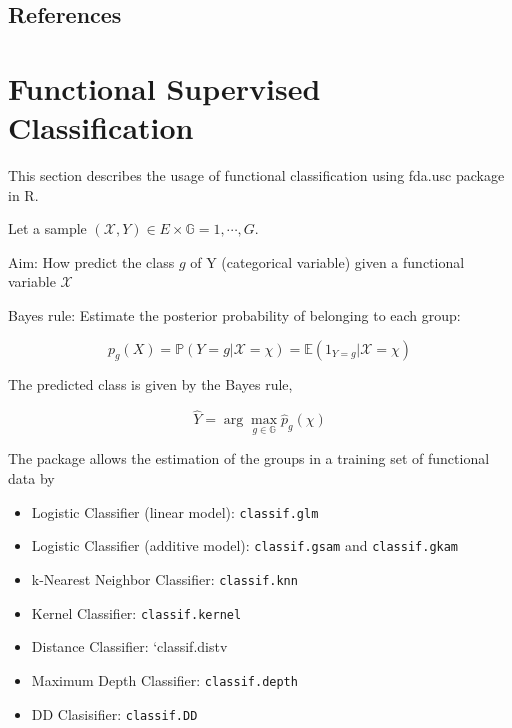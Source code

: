 \documentclass[
]{book}
\providecommand{\tightlist}{%
  \setlength{\itemsep}{0pt}\setlength{\parskip}{0pt}}
\begin{document}
\hypertarget{references-1}{%
\section{References}\label{references-1}}

\hypertarget{functional-supervised-classification}{%
\chapter{Functional Supervised Classification}\label{functional-supervised-classification}}

This section describes the usage of functional classification using fda.usc package in R.

Let a sample \((\mathcal{X},Y)\in E \times \mathbb{G}={1,\cdots,G}\).

Aim: How predict the class \(g\) of Y (categorical variable) given a functional variable \(\mathcal{X}\)

Bayes rule: Estimate the posterior probability of belonging to each group:

\[p_g(X)=\mathbb{P}(Y=g | \mathcal{X}=\chi)=\mathbb{E}(1_{Y=g} |\mathcal{X}=\chi)\]

The predicted class is given by the Bayes rule,

\[\hat{Y}=\arg \max_{g\in \mathbb{G}} \hat{p}_g(\chi)\]

The package allows the estimation of the groups in a training set of functional data by

\begin{itemize}
\tightlist
\item
  Logistic Classifier (linear model): \texttt{classif.glm}
\item
  Logistic Classifier (additive model): \texttt{classif.gsam} and \texttt{classif.gkam}
\item
  k-Nearest Neighbor Classifier: \texttt{classif.knn}
\item
  Kernel Classifier: \texttt{classif.kernel}
\item
  Distance Classifier: `classif.distv
\item
  Maximum Depth Classifier: \texttt{classif.depth}
\item
  DD Clasisifier: \texttt{classif.DD}
\end{itemize}
\end{document}
